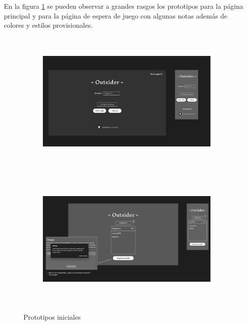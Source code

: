 En la figura \ref{fig:res_designLanding} se pueden observar a grandes rasgos los 
prototipos para la página principal y para la página de espera de juego con algunas notas además de colores 
y estilos provisionales.


\begin{figure}[h]													
	\begin{subfigure}{\textwidth}
		\centering
		\includegraphics[height=7cm]{res_designLanding.png}
	\end{subfigure}
																																																																																																																																																																													
	\begin{subfigure}{\textwidth}
		\centering
		\includegraphics[height=7cm]{res_designLobby.png} 
	\end{subfigure}
																																																																																																																																																																																				
	\caption{Prototipos iniciales}
	\label{fig:res_designLanding}										
\end{figure}

